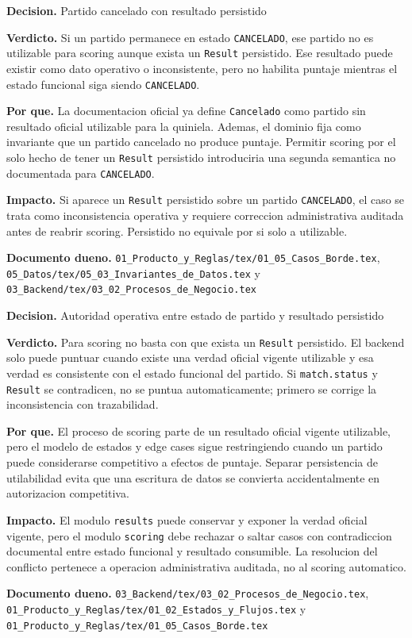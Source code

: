 \begin{docnote}
\textbf{Decision.} Partido cancelado con resultado persistido

\textbf{Verdicto.} Si un partido permanece en estado \texttt{CANCELADO}, ese partido no es utilizable para scoring aunque exista un \texttt{Result} persistido. Ese resultado puede existir como dato operativo o inconsistente, pero no habilita puntaje mientras el estado funcional siga siendo \texttt{CANCELADO}.

\textbf{Por que.} La documentacion oficial ya define \texttt{Cancelado} como partido sin resultado oficial utilizable para la quiniela. Ademas, el dominio fija como invariante que un partido cancelado no produce puntaje. Permitir scoring por el solo hecho de tener un \texttt{Result} persistido introduciria una segunda semantica no documentada para \texttt{CANCELADO}.

\textbf{Impacto.} Si aparece un \texttt{Result} persistido sobre un partido \texttt{CANCELADO}, el caso se trata como inconsistencia operativa y requiere correccion administrativa auditada antes de reabrir scoring. Persistido no equivale por si solo a utilizable.

\textbf{Documento dueno.} \texttt{01\_Producto\_y\_Reglas/tex/01\_05\_Casos\_Borde.tex}, \texttt{05\_Datos/tex/05\_03\_Invariantes\_de\_Datos.tex} y \texttt{03\_Backend/tex/03\_02\_Procesos\_de\_Negocio.tex}
\end{docnote}

\begin{docnote}
\textbf{Decision.} Autoridad operativa entre estado de partido y resultado persistido

\textbf{Verdicto.} Para scoring no basta con que exista un \texttt{Result} persistido. El backend solo puede puntuar cuando existe una verdad oficial vigente utilizable y esa verdad es consistente con el estado funcional del partido. Si \texttt{match.status} y \texttt{Result} se contradicen, no se puntua automaticamente; primero se corrige la inconsistencia con trazabilidad.

\textbf{Por que.} El proceso de scoring parte de un resultado oficial vigente utilizable, pero el modelo de estados y edge cases sigue restringiendo cuando un partido puede considerarse competitivo a efectos de puntaje. Separar persistencia de utilabilidad evita que una escritura de datos se convierta accidentalmente en autorizacion competitiva.

\textbf{Impacto.} El modulo \texttt{results} puede conservar y exponer la verdad oficial vigente, pero el modulo \texttt{scoring} debe rechazar o saltar casos con contradiccion documental entre estado funcional y resultado consumible. La resolucion del conflicto pertenece a operacion administrativa auditada, no al scoring automatico.

\textbf{Documento dueno.} \texttt{03\_Backend/tex/03\_02\_Procesos\_de\_Negocio.tex}, \texttt{01\_Producto\_y\_Reglas/tex/01\_02\_Estados\_y\_Flujos.tex} y \texttt{01\_Producto\_y\_Reglas/tex/01\_05\_Casos\_Borde.tex}
\end{docnote}

